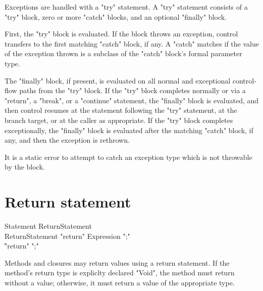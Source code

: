 Exceptions are handled with a \xcd"try" statement.
A \xcd"try" statement consists of a \xcd"try" block, zero or more
\xcd"catch" blocks, and an optional \xcd"finally" block.

First, the \xcd"try" block is evaluated.  If the block throws an
exception, control transfers to the first matching \xcd"catch"
block, if any.  A \xcd"catch" matches if the value of the
exception thrown is a subclass of the \xcd"catch" block's formal
parameter type.

The \xcd"finally" block, if present, is evaluated on all normal
and exceptional control-flow paths from the \xcd"try" block.
If the \xcd"try" block completes normally
or via a \xcd"return", a \xcd"break", or a
\xcd"continue" statement, 
the \xcd"finally"
block is evaluated, and then control resumes at
the statement following the \xcd"try" statement, at the branch target, or at
the caller as appropriate.
If the \xcd"try" block completes
exceptionally, the \xcd"finally" block is evaluated after the
matching \xcd"catch" block, if any, and then the
exception is rethrown.

It is a static error to attempt to catch an exception type which is not
throwable by the block.  

\section{Return statement}
\label{ReturnStatement}
\begin{grammar}
Statement \: ReturnStatement \\
ReturnStatement \: \xcd"return" Expression \xcd";" \\
             \| \xcd"return" \xcd";" \\
\end{grammar}

Methods and closures may return values using a return statement.
If the method's return type is expliclty declared \xcd"Void",
the method must return without a value; otherwise, it must return
a value of the appropriate type.
